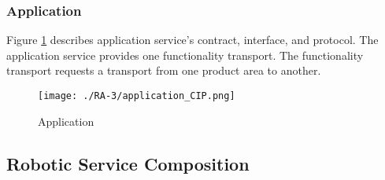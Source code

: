 \subsubsection{Application} %
Figure \ref{fig:application_cip} describes application service's contract, interface, and protocol. The application service provides one functionality transport. The functionality transport requests a transport from one product area to another. 
\begin{figure}[ht!]
 \centering
 \texttt{[image: ./RA-3/application\_CIP.png]}
 \caption{Application}
 \label{fig:application_cip}
\end{figure}

\subsection{Robotic Service Composition}
